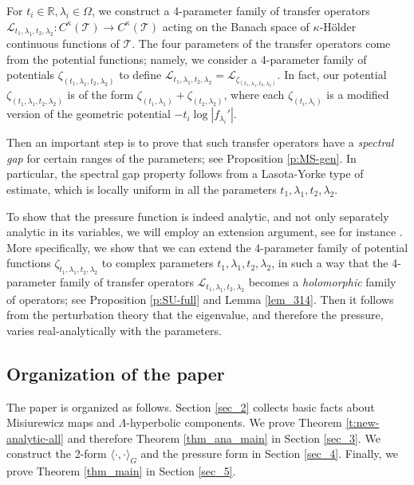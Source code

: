 \documentclass[11pt]{amsart}
\theoremstyle{plain}
\theoremstyle{definition}
\theoremstyle{remark}
\begin{document}
For $t_i \in \mathbb R, \lambda_i \in \Omega$, we construct a 4-parameter family of transfer operators $\mathcal{L}_{t_1,\lambda_1,t_2,\lambda_2} \colon C^\kappa(\mathcal{T}) \to C^\kappa(\mathcal{T})$ acting on the Banach space of $\kappa$-H\"older continuous functions of $\mathcal{T}$. The four parameters of the transfer operators come from the potential functions; namely, we consider a 4-parameter family of potentials $\zeta_{(t_1,\lambda_1,t_2,\lambda_2)}$ to define $\mathcal{L}_{t_1,\lambda_1,t_2,\lambda_2} = \mathcal{L}_{\zeta_{(t_1,\lambda_1,t_2,\lambda_2)}}$. In fact, our potential $\zeta_{(t_1,\lambda_1,t_2,\lambda_2)}$ is of the form $\zeta_{(t_1,\lambda_1)} + \zeta_{(t_2,\lambda_2)}$, where each $\zeta_{(t_i,\lambda_i)}$ is a modified version of the geometric potential $-t_i\log|f_{\lambda_i}'|$.

Then an important step is to prove that such transfer operators have a {\it spectral gap} for certain ranges of the parameters; see Proposition \ref{p:MS-gen}. In particular, the spectral gap property follows from a Lasota-Yorke type of estimate,
which is locally uniform in all the parameters $t_1, \lambda_1, t_2, \lambda_2$.

To show that the pressure function is indeed analytic, and not only separately analytic in its variables, we will employ an extension argument, see for instance \cite{SU10,UZ04real}.
More specifically, we show that we can extend the 4-parameter family of potential functions  $\zeta_{t_1,\lambda_1,t_2,\lambda_2}$ to complex parameters $t_1,\lambda_1,t_2,\lambda_2$, in such a way that the 4-parameter family of transfer operators $\mathcal{L}_{t_1,\lambda_1,t_2,\lambda_2}$ becomes a {\it holomorphic} family of operators; see Proposition \ref{p:SU-full} and Lemma \ref{lem_314}. Then it follows from the perturbation theory that the eigenvalue, and therefore the pressure, varies real-analytically with the parameters.


\subsection{Organization of the paper}
The paper is organized as follows. Section \ref{sec_2} collects basic facts about Misiurewicz maps and $\Lambda$-hyperbolic components. We prove Theorem \ref{t:new-analytic-all} and therefore Theorem \ref{thm_ana_main} in Section \ref{sec_3}. We construct the 2-form $\langle \cdot, \cdot \rangle_G$ and the pressure form in Section \ref{sec_4}. Finally, we prove Theorem \ref{thm_main} in Section \ref{sec_5}. 
\end{document}
